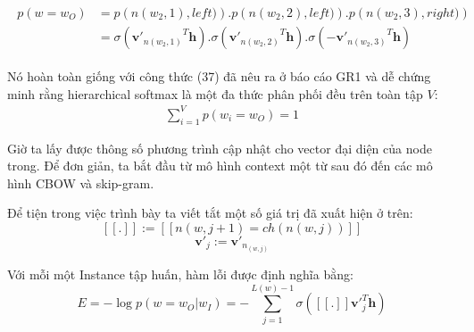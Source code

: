 \begin{eqnarray}
\begin{split}
p(w=w_O) &=p\left( n(w_2,1),left)\right) .p\left( n(w_2,2),left)\right) .p\left( n(w_2,3),right)\right) \\
&=\sigma\left( {\textbf{v}'_{n(w_2,1)}}^{T} \textbf{h} \right) . \sigma\left( {\textbf{v}'_{n(w_2,2)}}^{T} \textbf{h} \right) . \sigma\left( {-\textbf{v}'_{n(w_2,3)}}^{T} \textbf{h} \right)
\end{split}
\end{eqnarray}





Nó hoàn toàn giống với công thức (37) đã nêu ra ở báo cáo GR1 và dễ chứng minh rằng hierarchical softmax là một đa thức phân phối đều trên toàn tập $V$:
\begin{eqnarray}
\sum^{V}_{i=1} p(w_i=w_O) =1
\end{eqnarray}

Giờ ta lấy được thông số phương trình cập nhật cho vector đại diện của node trong. Để đơn giản, ta bắt đầu từ mô hình context một từ sau đó đến các mô hình CBOW và skip-gram. 

Để tiện trong việc trình bày ta viết tắt một số giá trị đã xuất hiện ở trên:
\begin{equation}
\left[ \left[ . \right] \right] := \left[  \left[ n(w,j+1)=ch(n(w,j)) \right]  \right]
\end{equation}
\begin{equation}
\textbf{v}'_j := \textbf{v}'_{n_(w,j)}
\end{equation}

Với mỗi một Instance tập huấn, hàm lỗi được định nghĩa bằng:
\begin{equation}
E = - \log{p\left( w = w_O|w_I \right)} = -\sum^{L(w)-1}_{j=1}\sigma\left( \left[ \left[ . \right] \right] \textbf{v}'^{T}_{j} \textbf{h} \right) 
\end{equation}

